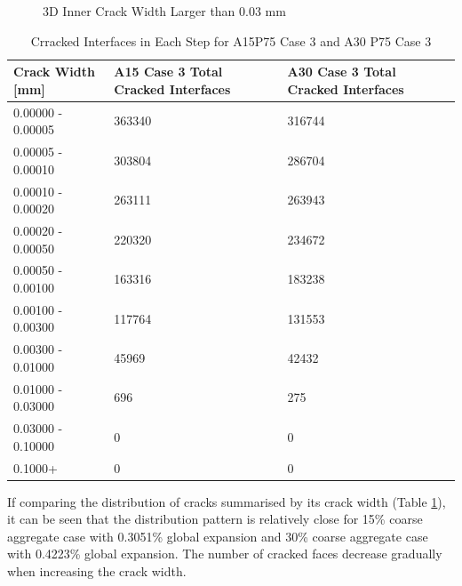 \begin{figure}[!h]
  \caption{3D Inner Crack Width Larger than 0.03 mm}
  \label{fig:ASR_A15P75_crackffa}
\end{figure}

\begin{table}[!h]
  \caption{Crracked Interfaces in Each Step for A15P75 Case 3 and A30 P75 Case 3}
\centering
\begin{tabular}{ ||p{4cm}|p{4cm}|p{4cm}|| }
\hline
 Crack Width [mm] &  A15 Case 3 Total Cracked Interfaces &  A30 Case 3 Total Cracked Interfaces \\
 \hline\hline

   0.00000 - 0.00005 & 363340 & 316744 \\
   0.00005 - 0.00010 & 303804 & 286704 \\
   0.00010 - 0.00020 & 263111 & 263943 \\
   0.00020 - 0.00050 & 220320 & 234672 \\
   0.00050 - 0.00100 & 163316 & 183238 \\
   0.00100 - 0.00300 & 117764 & 131553 \\
   0.00300 - 0.01000 & 45969 & 42432 \\
   0.01000 - 0.03000 & 696 & 275 \\
   0.03000 - 0.10000 & 0 & 0 \\
   0.1000+ & 0 & 0 \\

  \hline
  \end{tabular}

\label{table:A15vsA30P75_3_Cracksx}
\end{table}


If comparing the distribution of cracks summarised by its crack width (Table \ref{table:A15vsA30P75_3_Cracksx}),  it can be seen that the distribution pattern is relatively close for 15\% coarse aggregate case with 0.3051\% global expansion and  30\% coarse aggregate case with 0.4223\% global expansion.  The number of cracked faces decrease gradually when increasing the crack width.


